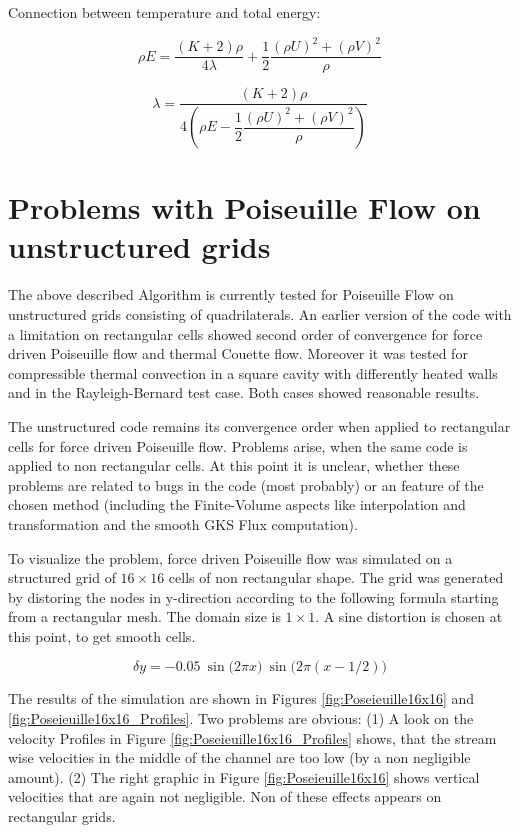 \documentclass[
	pdftex,             %
	12pt,				%
	a4paper,		   	%
	english,				%
	oneside,			%
]{article}
\begin{document}
Connection between temperature and total energy:

\begin{equation}
\rho E = \dfrac{(K+2)\rho}{4\lambda} + \dfrac{1}{2} \dfrac{(\rho U)^2 + (\rho V)^2}{\rho}
\end{equation}

\begin{equation}
\lambda =\frac{(K+2)\rho}
{4\left( \rho E - \dfrac{1}{2} \dfrac{(\rho U)^2 + (\rho V)^2}{\rho}  \right)}
\end{equation}

\clearpage
\section{Problems with Poiseuille Flow on unstructured grids}

The above described Algorithm is currently tested for Poiseuille Flow on unstructured grids consisting of quadrilaterals. An earlier version of the code with a limitation on rectangular cells showed second order of convergence for force driven Poiseuille flow and thermal Couette flow. Moreover it was tested for compressible thermal convection in a square cavity with differently heated walls and in the Rayleigh-Bernard test case. Both cases showed reasonable results.

The unstructured code remains its convergence order when applied to rectangular cells for force driven Poiseuille flow. Problems arise, when the same code is applied to non rectangular cells. At this point it is unclear, whether these problems are related to bugs in the code (most probably) or an feature of the chosen method (including the Finite-Volume aspects like interpolation and transformation and the smooth GKS Flux computation).

To visualize the problem, force driven Poiseuille flow was simulated on a structured grid of $16 \times 16$ cells of non rectangular shape. The grid was generated by distoring the nodes in y-direction according to the following formula starting from a rectangular mesh. The domain size is $1 \times 1$. A sine distortion is chosen at this point, to get smooth cells.

\begin{equation}
\delta y = -0.05 ~ \sin \big(2 \pi x \big) ~ \sin \big(2 \pi (x-1/2) \big)
\end{equation}

The results of the simulation are shown in Figures \ref{fig:Poseieuille16x16} and  \ref{fig:Poseieuille16x16_Profiles}. Two problems are obvious: (1) A look on the velocity Profiles in Figure \ref{fig:Poseieuille16x16_Profiles} shows, that the stream wise velocities in the middle of the channel are too low (by a non negligible amount). (2) The right graphic in Figure \ref{fig:Poseieuille16x16} shows vertical velocities that are again not negligible. Non of these effects appears on rectangular grids.
\end{document}
